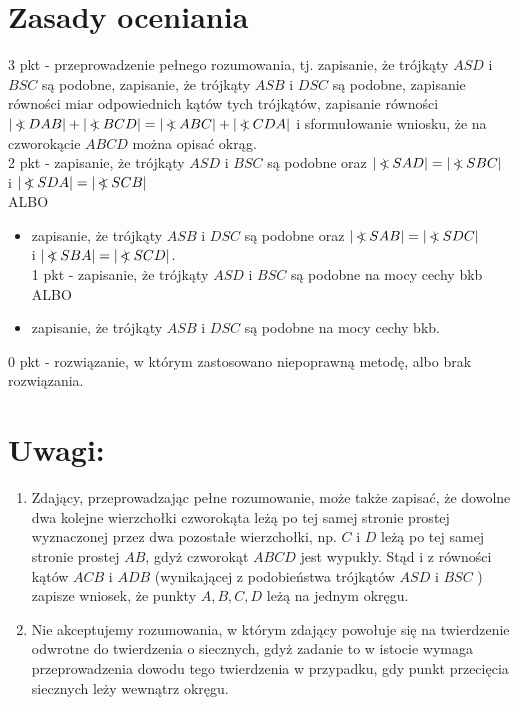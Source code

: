 \documentclass[10pt]{article}
\newcommand\Varangle{\mathop{{<\!\!\!\!\!\text{\small)}}\:}\nolimits}
\begin{document}
\section*{Zasady oceniania}
3 pkt - przeprowadzenie pełnego rozumowania, tj. zapisanie, że trójkąty $A S D$ i $B S C$ są podobne, zapisanie, że trójkąty $A S B$ i $D S C$ są podobne, zapisanie równości miar odpowiednich kątów tych trójkątów, zapisanie równości\\
$|\Varangle D A B|+|\Varangle B C D|=|\Varangle A B C|+|\Varangle C D A|$ i sformułowanie wniosku, że na czworokącie $A B C D$ można opisać okrąg.\\
2 pkt - zapisanie, że trójkąty $A S D$ i $B S C$ są podobne oraz $|\Varangle S A D|=|\Varangle S B C|$\\
i $|\Varangle S D A|=|\Varangle S C B|$\\
ALBO

\begin{itemize}
  \item zapisanie, że trójkąty $A S B$ i $D S C$ są podobne oraz $|\Varangle S A B|=|\Varangle S D C|$\\
i $|\Varangle S B A|=|\Varangle S C D|$.\\
1 pkt - zapisanie, że trójkąty $A S D$ i $B S C$ są podobne na mocy cechy bkb ALBO
  \item zapisanie, że trójkąty $A S B$ i $D S C$ są podobne na mocy cechy bkb.
\end{itemize}

0 pkt - rozwiązanie, w którym zastosowano niepoprawną metodę, albo brak rozwiązania.

\section*{Uwagi:}
\begin{enumerate}
  \item Zdający, przeprowadzając pełne rozumowanie, może także zapisać, że dowolne dwa kolejne wierzchołki czworokąta leżą po tej samej stronie prostej wyznaczonej przez dwa pozostałe wierzchołki, np. $C$ i $D$ leżą po tej samej stronie prostej $A B$, gdyż czworokąt $A B C D$ jest wypukły. Stąd i z równości kątów $A C B$ i $A D B$ (wynikającej z podobieństwa trójkątów $A S D$ i $B S C$ ) zapisze wniosek, że punkty $A, B, C, D$ leżą na jednym okręgu.
  \item Nie akceptujemy rozumowania, w którym zdający powołuje się na twierdzenie odwrotne do twierdzenia o siecznych, gdyż zadanie to w istocie wymaga przeprowadzenia dowodu tego twierdzenia w przypadku, gdy punkt przecięcia siecznych leży wewnątrz okręgu.
\end{enumerate}
\end{document}
